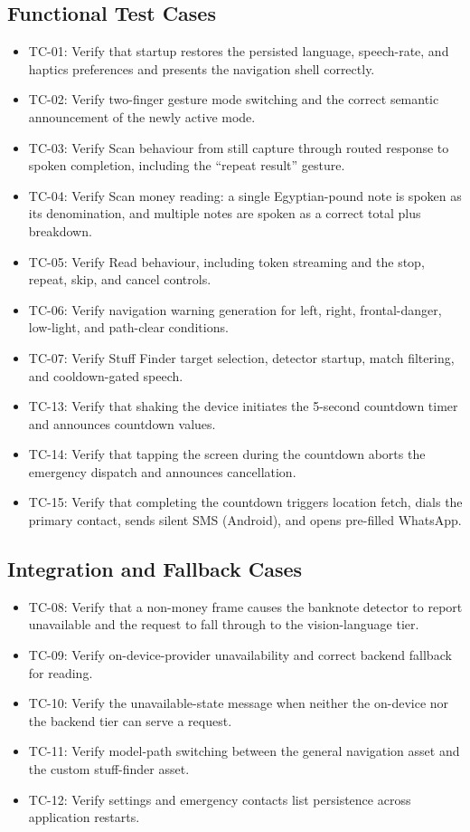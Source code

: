 \documentclass[12pt,a4paper]{report}
\begin{document}
\subsection{Functional Test Cases}
\begin{itemize}
  \item TC-01: Verify that startup restores the persisted language, speech-rate, and haptics preferences and presents the navigation shell correctly.
  \item TC-02: Verify two-finger gesture mode switching and the correct semantic announcement of the newly active mode.
  \item TC-03: Verify Scan behaviour from still capture through routed response to spoken completion, including the ``repeat result'' gesture.
  \item TC-04: Verify Scan money reading: a single Egyptian-pound note is spoken as its denomination, and multiple notes are spoken as a correct total plus breakdown.
  \item TC-05: Verify Read behaviour, including token streaming and the stop, repeat, skip, and cancel controls.
  \item TC-06: Verify navigation warning generation for left, right, frontal-danger, low-light, and path-clear conditions.
  \item TC-07: Verify Stuff Finder target selection, detector startup, match filtering, and cooldown-gated speech.
  \item TC-13: Verify that shaking the device initiates the 5-second countdown timer and announces countdown values.
  \item TC-14: Verify that tapping the screen during the countdown aborts the emergency dispatch and announces cancellation.
  \item TC-15: Verify that completing the countdown triggers location fetch, dials the primary contact, sends silent SMS (Android), and opens pre-filled WhatsApp.
\end{itemize}

\subsection{Integration and Fallback Cases}
\begin{itemize}
  \item TC-08: Verify that a non-money frame causes the banknote detector to report unavailable and the request to fall through to the vision-language tier.
  \item TC-09: Verify on-device-provider unavailability and correct backend fallback for reading.
  \item TC-10: Verify the unavailable-state message when neither the on-device nor the backend tier can serve a request.
  \item TC-11: Verify model-path switching between the general navigation asset and the custom stuff-finder asset.
  \item TC-12: Verify settings and emergency contacts list persistence across application restarts.
\end{itemize}
\end{document}
